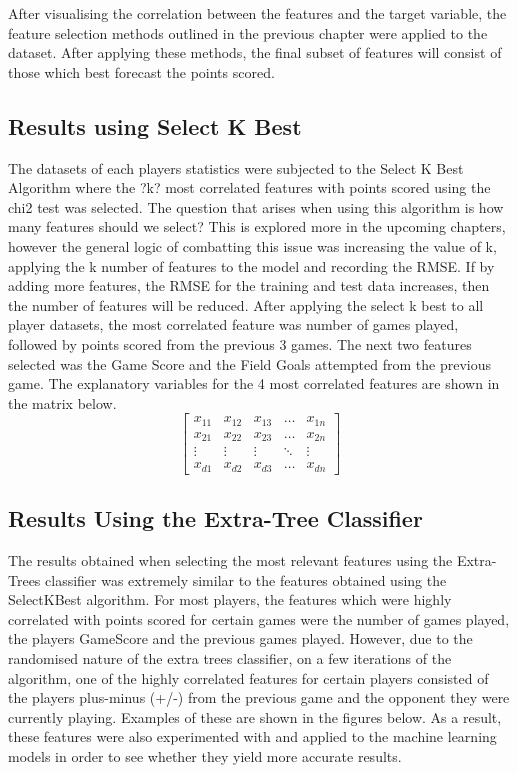 \documentclass[a4paper,11pt,twoside]{article}
\begin{document}
After visualising the correlation between the features and the target variable, the feature selection methods outlined in the previous chapter were applied to the dataset. After applying these methods, the final subset of features will consist of those which best forecast the points scored.

\subsection{Results using Select K Best}

The datasets of each players statistics were subjected to the Select K Best Algorithm where the ?k? most correlated features with points scored using the chi2 test was selected. The question that arises when using this algorithm is how many features should we select? This is explored more in the upcoming chapters, however the general logic of combatting this issue was increasing the value of k, applying the k number of features to the model and recording the RMSE. If by adding more features, the RMSE for the training and test data increases, then the number of features will be reduced. After applying the select k best to all player datasets, the most correlated feature was number of games played, followed by points scored from the previous 3 games. The next two features selected was the Game Score and the Field Goals attempted from the previous game. The explanatory variables for the 4 most correlated features are shown in the matrix below.
\[
\begin{bmatrix}
    x_{11} & x_{12} & x_{13} & \dots  & x_{1n} \\
    x_{21} & x_{22} & x_{23} & \dots  & x_{2n} \\
    \vdots & \vdots & \vdots & \ddots & \vdots \\
    x_{d1} & x_{d2} & x_{d3} & \dots  & x_{dn}
\end{bmatrix}
\]

\subsection{Results Using the Extra-Tree Classifier}

The results obtained when selecting the most relevant features using the Extra-Trees classifier was extremely similar to the features obtained using the SelectKBest algorithm. For most players, the features which were highly correlated with points scored for certain games were the number of games played, the players GameScore and the previous games played. However, due to the randomised nature of the extra trees classifier, on a few iterations of the algorithm, one of the highly correlated features for certain players consisted of the players plus-minus (+/-) from the previous game and the opponent they were currently playing. Examples of these are shown in the figures below. As a result, these features were also experimented with and applied to the machine learning models in order to see whether they yield more accurate results.
\end{document}
